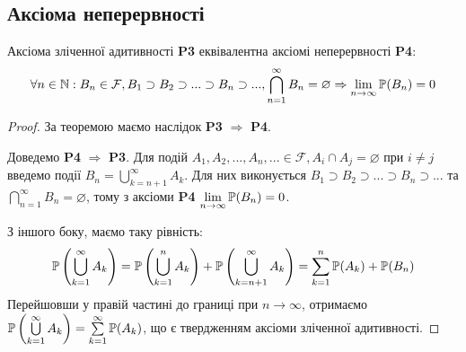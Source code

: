 \subsection{Аксіома неперервності}
\begin{theorem}
    Аксіома зліченної адитивності \textbf{P3} еквівалентна аксіомі неперервності
    \textbf{P4}: $$\forall n \in \mathbb{N}: B_n \in \mathcal{F}, B_1 \supset B_2 \supset ... \supset B_n \supset ..., \bigcap\limits_{n=1}^{\infty} B_n = \varnothing \Rightarrow \lim_{n\rightarrow \infty} \P(B_n) = 0$$
    \begin{proof}
        За теоремою  маємо наслідок \textbf{P3} $\Rightarrow$ \textbf{P4}.

        Доведемо \textbf{P4} $\Rightarrow$ \textbf{P3}. Для подій $A_1, A_2, ... , A_n, ... \in \mathcal{F}, A_i \cap A_j = \varnothing \text{ при } i \neq j$
        введемо події $B_n = \bigcup\limits_{k=n+1}^{\infty} A_k$. Для них виконується $B_1 \supset B_2 \supset ... \supset B_n \supset ...$ та $\bigcap\limits_{n=1}^{\infty} B_n = \varnothing$,
        тому з аксіоми \textbf{P4} $\lim\limits_{n\rightarrow \infty} \P(B_n) = 0$.

        З іншого боку, маємо таку рівність:
        $$\P\left(\bigcup\limits_{k=1}^{\infty} A_k\right) = \P\left(\bigcup\limits_{k=1}^{n} A_k\right) + \P\left(\bigcup\limits_{k=n+1}^{\infty} A_k\right) = \sum\limits_{k=1}^{n} \P(A_k) + \P(B_n)$$
        Перейшовши у правій частині до границі при $n \rightarrow \infty$, отримаємо $\P\left(\bigcup\limits_{k=1}^{\infty} A_k\right) = \sum\limits_{k=1}^{\infty} \P(A_k)$, 
        що є твердженням аксіоми зліченної адитивності.
    \end{proof}
\end{theorem}
